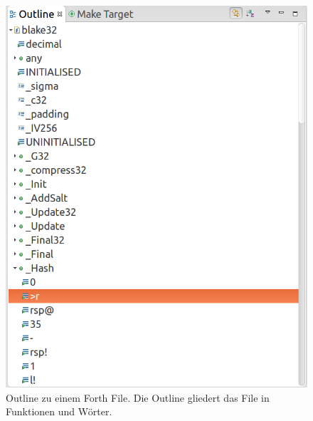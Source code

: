 \begin{figure}[H]
	\centering
		\includegraphics[scale=0.3]{fortheditor/outline.png}
		\caption{Outline zu einem Forth File. Die Outline gliedert das File in Funktionen und Wörter.}
		\label{fig:outlineeditor}
\end{figure}

